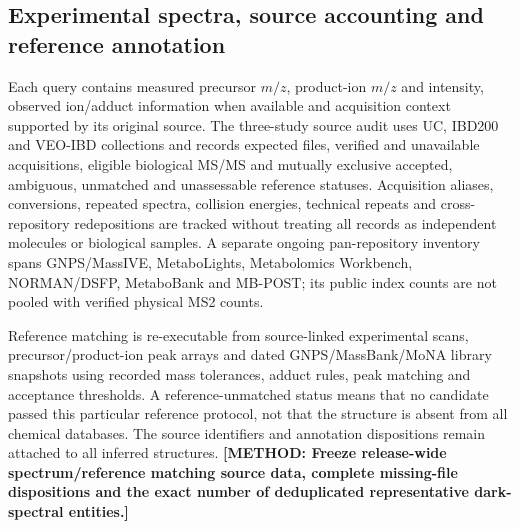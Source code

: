 \documentclass[11pt]{article}
\newcommand{\methodtodo}[1]{\textbf{\textcolor{orbitviolet}{[METHOD: #1]}}}
\begin{document}
\subsection*{Experimental spectra, source accounting and reference annotation}
Each query contains measured precursor \(m/z\), product-ion \(m/z\) and intensity, observed ion/adduct information when available and acquisition context supported by its original source. The three-study source audit uses UC, IBD200 and VEO-IBD collections and records expected files, verified and unavailable acquisitions, eligible biological MS/MS and mutually exclusive accepted, ambiguous, unmatched and unassessable reference statuses. Acquisition aliases, conversions, repeated spectra, collision energies, technical repeats and cross-repository redepositions are tracked without treating all records as independent molecules or biological samples. A separate ongoing pan-repository inventory spans GNPS/MassIVE, MetaboLights, Metabolomics Workbench, NORMAN/DSFP, MetaboBank and MB-POST; its public index counts are not pooled with verified physical MS2 counts.

Reference matching is re-executable from source-linked experimental scans, precursor/product-ion peak arrays and dated GNPS/MassBank/MoNA library snapshots using recorded mass tolerances, adduct rules, peak matching and acceptance thresholds. A reference-unmatched status means that no candidate passed this particular reference protocol, not that the structure is absent from all chemical databases. The source identifiers and annotation dispositions remain attached to all inferred structures. \methodtodo{Freeze release-wide spectrum/reference matching source data, complete missing-file dispositions and the exact number of deduplicated representative dark-spectral entities.}
\end{document}
